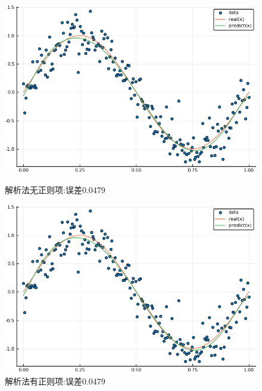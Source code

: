 \documentclass{ML}
\begin{document}
\begin{figure}[H]
	\begin{minipage}[c]{0.5\linewidth}
		\centering
		\includegraphics[width=0.9\linewidth]{media/200/ResolveNoLambda}
		\caption{解析法无正则项:误差0.0479} %
		\label{fig:resolvenolambda200}
	\end{minipage}
	\begin{minipage}[c]{0.5\linewidth}
		\centering
		\includegraphics[width=0.9\linewidth]{media/200/ResolveWithLambda}
		\caption{解析法有正则项:误差0.0479} %
		\label{fig:resolvenolambda200}
	\end{minipage}
\end{figure}
\end{document}
